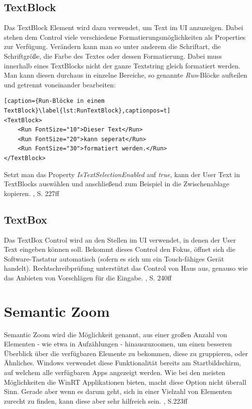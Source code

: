 \documentclass[a4paper,bibtotoc,oneside]{scrbook}
\begin{document}
\subsection[TextBlock]{TextBlock}
Das TextBlock Element wird dazu verwendet, um Text im UI anzuzeigen. Dabei stehen dem Control viele verschiedene Formatierungsmöglichkeiten als Properties zur Verfügung. Verändern kann man so unter anderem die Schriftart, die Schriftgröße, die Farbe des Textes oder dessen Formatierung.
\newline
Dabei muss innerhalb eines TextBlocks nicht der ganze Textstring gleich formatiert werden. Man kann diesen durchaus in einzelne Bereiche, so genannte \textit{Run}-Blöcke aufteilen und getrennt voneinander bearbeiten:
\newline
\begin{lstlisting}[caption={Run-Blöcke in einem TextBlock}\label{lst:RunTextBlock},captionpos=t]
<TextBlock>
	<Run FontSize="10">Dieser Text</Run>
	<Run FontSize="20">kann seperat</Run>
	<Run FontSize="30">formatiert werden.</Run>
</TextBlock>
\end{lstlisting}
Setzt man das Property \textit{IsTextSelectionEnabled} auf \textit{true}, kann der User Text in TextBlocks auswählen und anschließend zum Beispiel in die Zwischenablage kopieren.
\cite{ana12}, S. 227ff

\subsection[TextBox]{TextBox}
Das TextBox Control wird an den Stellen im UI verwendet, in denen der User Text eingeben können soll. Bekommt dieses Control den Fokus, öffnet sich die Software-Tastatur automatisch (sofern es sich um ein Touch-fähiges Gerät handelt). Rechtschreibprüfung unterstützt das Control von Haus aus, genauso wie das Anbieten von Vorschlägen für die Eingabe. \cite{ana12}, S. 240ff

\section[Semantic Zoom]{Semantic Zoom}
Semantic Zoom wird die Möglichkeit genannt, aus einer großen Anzahl von Elementen - wie etwa in Aufzählungen - hinauszuzoomen, um einen besseren Überblick über die verfügbaren Elemente zu bekommen, diese zu gruppieren, oder Ähnliches. Windows verwendet diese Funktionalität bereits am Startbildschirm, auf welchem alle verfügbaren Apps angezeigt werden.
\newline
\newline
Wie bei den meisten Möglichkeiten die WinRT Applikationen bieten, macht diese Option nicht überall Sinn. Gerade aber wenn es darum geht, sich in einer Vielzahl von Elementen zurecht zu finden, kann diese aber sehr hilfreich sein. \cite{ana12}, S.223ff
\end{document}
